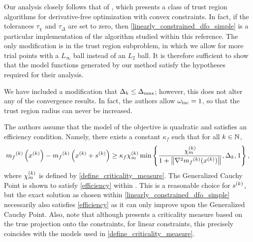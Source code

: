 %





Our analysis closely follows that of \cite{Conejo:2013:GCT:2620806.2621814},
which presents a class of trust region algorithms for derivative-free optimization with convex constraints.
In fact, if the tolerances $\tau_{\chi}$ and $\tau_{\Delta}$ are set to zero,  
then \cref{linearly_constrained_dfo_simple} is a particular implementation of the algorithm studied within this reference.
The only modification is in the trust region subproblem, in which we allow for more trial points with a $L_{\infty}$ ball instead of an $L_2$ ball.
It is therefore sufficient to show that the model functions generated by our method satisfy the hypotheses required for their analysis.

We have included a modification that $\Delta_k \le {\Delta_{\textrm{max}}}$; however, this does not alter any of the convergence results.
In fact, the authors allow $\omega_{\text{inc}} = 1$, so that the trust region radius can never be increased.

The authors assume that the model of the objective is quadratic and satisfies an efficiency condition.
Namely, there exists a constant $\kappa_f$ such that for all $k \in \mathbb N$,
\begin{align}
\label{efficiency}
{{m}_f}^{(k)}\left(x^{(k)}\right) - {{m}_f}^{(k)}\left(x^{(k)} + {{s}^{(k)}}\right) \ge \kappa_f {\chi_m^{(k)}} \min\left\{ \frac{{\chi_m^{(k)}}}{1+\left\|\nabla^2 {{m}_f}^{(k)}(x^{(k)})\right\|}, \Delta_k, 1 \right\},
\end{align}
where ${\chi_m^{(k)}}$ is defined by \cref{define_criticality_measure}.
The Generalized Cauchy Point is shown to satisfy \cref{efficiency} within \cite{Conn:2000:TM:357813}.
This is a reasonable choice for ${{s}^{(k)}}$, but the exact solution as chosen within \cref{linearly_constrained_dfo_simple} 
necessarily also satisfies \cref{efficiency} as it can only improve upon the Generalized Cauchy Point.
Also, note that although \cite{Conejo:2013:GCT:2620806.2621814} presents a criticality measure based on the true projection onto the constraints,
for linear constraints, this precisely coincides with the models used in \cref{define_criticality_measure}.

